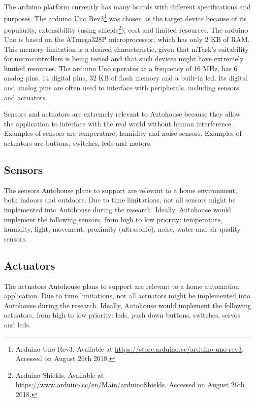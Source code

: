 The \gls{arduino} platform currently has many boards with different specifications and purposes. The \gls{arduino} Uno Rev3\footnote{Arduino Uno Rev3. Available at \url{https://store.arduino.cc/arduino-uno-rev3}. Accessed on August 26th 2018.} was chosen as the target device because of its popularity, extensibility (using shields\footnote{Arduino Shields. Available at \url{https://www.arduino.cc/en/Main/arduinoShields}. Accessed on August 26th 2018.}), cost and limited resources. The \gls{arduino} Uno is based on the ATmega328P microprocessor, which has only 2 KB of RAM. This memory limitation is a desired characteristic, given that \gls{mTask}'s suitability for microcontrollers is being tested and that such devices might have extremely limited resources. The \gls{arduino} Uno operates at a frequency of 16 MHz, has 6 analog pins, 14 digital pins, 32 KB of flash memory and a built-in \acs{led}. Its digital and analog pins are often used to interface with peripherals, including sensors and actuators. 



Sensors and actuators are extremely relevant to Autohouse because they allow the application to interface with the real world without human interference. Examples of sensors are temperature, humidity and noise sensors. Examples of actuators are buttons, switches, \acsp{led} and motors.

\subsection{Sensors}

The sensors Autohouse plans to support are relevant to a home environment, both indoors and outdoors. Due to time limitations, not all sensors might be implemented into Autohouse during the research. Ideally, Autohouse would implement the following sensors, from high to low priority: temperature, humidity, light, movement, proximity (ultrasonic), noise, water and air quality sensors. 

\subsection{Actuators}

The actuators Autohouse plans to support are relevant to a home automation application. Due to time limitations, not all actuators might be implemented into Autohouse during the research. Ideally, Autohouse would implement the following actuators, from high to low priority: \acsp{led}, push down buttons, switches, servos and \acsp{lcd}.


